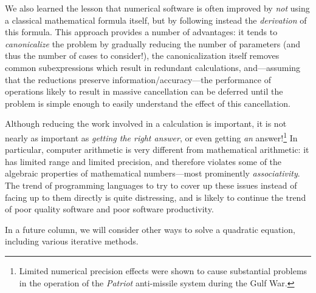 \documentclass[twocolumn,epsf]{snBaker}
\begin{document}
We also learned the lesson that numerical software is often improved
by {\it not} using a classical mathematical formula itself, but by
following instead the {\it derivation} of this formula.  This
approach provides a number of advantages: it tends to {\it
canonicalize} the problem by gradually reducing the number of
parameters (and thus the number of cases to consider!), the
canonicalization itself removes common subexpressions which result in
redundant calculations, and---assuming that the reductions preserve
information/accuracy---the performance of operations likely to result
in massive cancellation can be deferred until the problem is simple
enough to easily understand the effect of this cancellation.

Although reducing the work involved in a calculation is important, it
is not nearly as important as {\it getting the right answer}, or even
getting {\it an} answer!\footnote{Limited numerical precision
effects were shown to cause substantial problems in the operation of
the {\it Patriot} anti-missile system during the Gulf War.} In
particular, computer arithmetic is very different from mathematical
arithmetic: it has limited range and limited precision, and therefore
violates some of the algebraic properties of mathematical
numbers---most prominently {\it associativity}.  The trend of
programming languages to try to cover up these issues instead of
facing up to them directly is quite distressing, and is likely to
continue the trend of poor quality software and poor software
productivity.

In a future column, we will consider other ways to solve a quadratic
equation, including various iterative methods.
\end{document}
